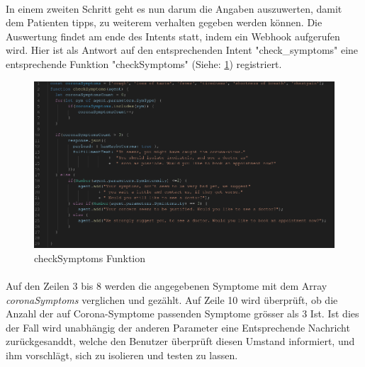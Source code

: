 \documentclass[11pt, letterpaper]{article}
\begin{document}
        \paragraph{}
            In einem zweiten Schritt geht es nun darum die Angaben auszuwerten, damit dem Patienten tipps, zu weiterem verhalten
            gegeben werden können. Die Auswertung findet am ende des Intents statt, indem ein Webhook aufgerufen wird.
            Hier ist als Antwort auf den entsprechenden Intent "check\_symptoms" eine entsprechende Funktion "checkSymptoms" (Siehe: \ref{fig:checksymptomsfunction})
            registriert.
        \begin{figure}[h!]
            \begin{center}
                \includegraphics[width=\linewidth]{ressources/checkSymptoms.png}
            \end{center}
            \caption{checkSymptoms Funktion}
            \label{fig:checksymptomsfunction}
        \end{figure}
        \paragraph{}
            Auf den Zeilen 3 bis 8 werden die angegebenen Symptome mit dem Array \emph{coronaSymptoms} verglichen und gezählt.
            Auf Zeile 10 wird überprüft, ob die Anzahl der auf Corona-Symptome passenden Symptome grösser als 3 Ist. Ist dies
            der Fall wird unabhängig der anderen Parameter eine Entsprechende Nachricht zurückgesanddt, welche den Benutzer überprüft
            diesen Umstand informiert, und ihm vorschlägt, sich zu isolieren und testen zu lassen.
\end{document}
